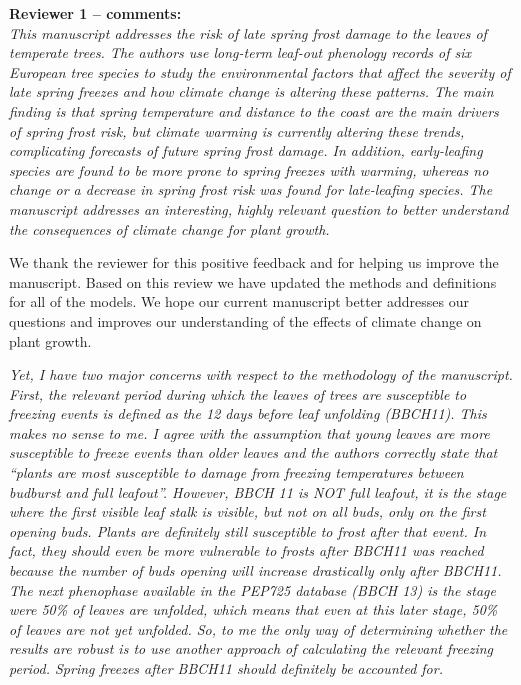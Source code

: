 \documentclass[11pt,a4paper]{article}
\begin{document}


\textbf {Reviewer 1 -- comments:} \\

\textit{This manuscript addresses the risk of late spring frost damage to the leaves of temperate trees. The authors use long-term leaf-out phenology records of six European tree species to study the environmental factors that affect the severity of late spring freezes and how climate change is altering these patterns. The main finding is that spring temperature and distance to the coast are the main drivers of spring frost risk, but climate warming is currently altering these trends, complicating forecasts of future spring frost damage. In addition, early-leafing species are found to be more prone to spring freezes with warming, whereas no change or a decrease in spring frost risk was found for late-leafing species. The manuscript addresses an interesting, highly relevant question to better understand the consequences of climate change for plant growth.}

We thank the reviewer for this positive feedback and for helping us improve the manuscript. Based on this review we have updated the methods and definitions for all of the models. We hope our current manuscript better addresses our questions and improves our understanding of the effects of climate change on plant growth.

\textit{Yet, I have two major concerns with respect to the methodology of the manuscript.
First, the relevant period during which the leaves of trees are susceptible to freezing events is defined as the 12 days before leaf unfolding (BBCH11). This makes no sense to me. I agree with the assumption that young leaves are more susceptible to freeze events than older leaves and the authors correctly state that “plants are most susceptible to
damage from freezing temperatures between budburst and full leafout”. However, BBCH 11 is NOT full leafout, it is the stage where the first visible leaf stalk is visible, but not on all buds, only on the first opening buds. Plants are definitely still susceptible to frost after that event. In fact, they should even be more vulnerable to frosts after BBCH11 was reached because the number of buds opening will increase drastically only after BBCH11. The next phenophase available in the PEP725 database (BBCH 13) is the stage were 50\% of leaves are unfolded, which means that even at this later stage, 50\% of leaves are not yet unfolded. So, to me the only way of determining whether the results are robust is to use another approach of calculating the relevant freezing period. Spring freezes after BBCH11 should definitely be accounted for.}
\end{document}
